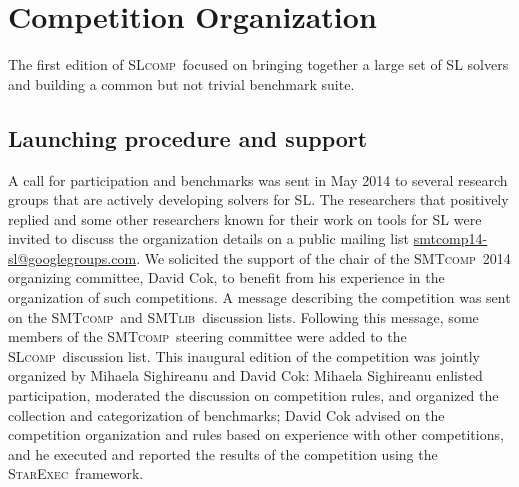 \documentclass[twoside,11pt]{article}
\newcommand{\smtlib}{\textsc{SMTlib}}
\newcommand{\smtcomp}{\textsc{SMTcomp}}
\newcommand{\slcomp}{\textsc{SLcomp}}
\newcommand{\starexec}{\textsc{StarExec}}
\begin{document}
\section{Competition Organization}

The first edition of \slcomp\ focused on %
bringing together a large set of SL solvers and
building a common but not trivial benchmark suite. 

\subsection{Launching procedure and support}
A call for participation and benchmarks was sent
in May 2014 %
to several research groups 
that are actively developing solvers for SL.
The researchers that positively replied and some other researchers known for their work on tools for SL were invited to discuss the organization details on a public mailing list \url{smtcomp14-sl@googlegroups.com}.
We solicited the support of the chair of the \smtcomp\ 2014 organizing committee, David Cok, to benefit from his experience in the organization of such competitions.
A message describing the competition was sent on the \smtcomp\ and \smtlib\ discussion lists. Following this message, some members of the \smtcomp\ steering committee were added to the \slcomp\ discussion list. 
This inaugural edition of the competition was jointly organized by Mihaela Sighireanu and David Cok:
Mihaela Sighireanu enlisted participation, moderated the discussion on competition rules, and organized the 
collection and categorization of benchmarks; David Cok advised on the competition organization and rules based on experience with other competitions, and he executed and reported the results of the competition using the \starexec\ framework.


\end{document}
